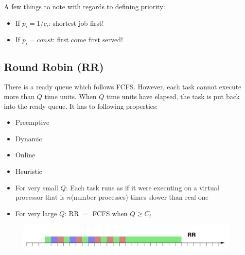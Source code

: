 \documentclass{hw}
\begin{document}
A few things to note with regards to defining priority:
\begin{itemize}
  \item If $p_{i} = 1/c_{i}$: shortest job first!
  \item If $p_{i} = const$: first come first served!
\end{itemize}

\subsection{Round Robin (RR)}
There is a ready queue which follows FCFS. However, each task cannot execute more
than $Q$ time units. When $Q$ time units have elapsed, the task is put back into 
the ready queue. It has to following properties:
\begin{itemize}
  \item Preemptive
  \item Dynamic
  \item Online
  \item Heuristic
  \item For very small $Q$: Each task runs as if it were executing on a virtual 
    processor that is $n$(number processes) times slower than real one
  \item For very large $Q$: RR $=$ FCFS when $Q \geq C_{i}$
\end{itemize}

\begin{figure}[H]
  \centering
  \includegraphics[scale=.6]{rr}
\end{figure}
\end{document}
